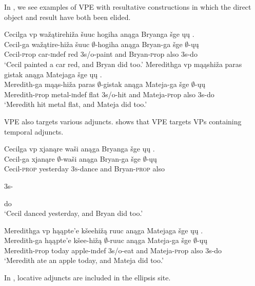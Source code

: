 \documentclass[output=paper]{LSP/langsci}
\begin{document}
In , we see examples of VPE with resultative constructions in which the direct object and result have both been elided. 

\ea\label{ex:johnson:6}
\ea\label{ex:johnson:6a}
\glll Cecilga  {\ob}{vp} wažątirehiža šuuc hogiha{\cb} anąga Bryanga šge {\ob}ųų{\cb} .\\
Cecil-ga {} wažątire-hiža šuuc $\emptyset$-hogiha anąga Bryan-ga šge $\emptyset$-ųų\\
Cecil-{\textsc prop} {} car-{\textsc indef} red {\textsc 3s/o}-paint and Bryan-{\textsc prop} also {\textsc 3s}-do\\
\trans `Cecil painted a car red, and Bryan did too.'
\ex\label{ex:johnson:6b}
\glll Meredithga  {\ob}{vp} mąąshiža paras gistak{\cb} anąga Matejaga šge {\ob}ųų{\cb} .\\
Meredith-ga {} mąąs-hiža paras $\emptyset$-gistak anąga Mateja-ga šge $\emptyset$-ųų\\
Meredith-{\textsc prop} {} metal-{\textsc indef} flat {\textsc 3s/o}-hit and Mateja-{\textsc prop} also {\textsc 3s}-do\\
\trans `Meredith hit metal flat, and Mateja did too.'
\z
\z

VPE also targets various adjuncts.  shows that VPE targets VPs containing temporal adjuncts. 

\ea\label{ex:johnson:7}
\ea
\glll Cecilga {\ob}{vp} xjanąre waši{\cb} anąga Bryanga šge {\ob}ųų{\cb} .\\
Cecil-ga {} xjanąre $\emptyset$-waši anąga Bryan-ga šge $\emptyset$-ųų\\
Cecil-\textsc{prop} {} yesterday \textsc{3s}-dance and Bryan-\textsc{prop} also \begin{sc}3s-\end{sc}do\\
\trans `Cecil danced yesterday, and Bryan did too.'

\ex
\glll Meredithga  {\ob}{vp} hąąpte'e kšeehižą ruuc{\cb} anąga Matejaga šge {\ob}ųų{\cb} .\\
Meredith-ga {} hąąpte'e kšee-hižą $\emptyset$-ruuc anąga Mateja-ga šge $\emptyset$-ųų\\
Meredith-{\textsc prop} {} today apple-{\textsc indef} {\textsc 3s/o}-eat and Mateja-{\textsc prop} also {\textsc 3s}-do\\
\trans `Meredith ate an apple today, and Mateja did too.'
\z
\z

In , locative adjuncts are included in the ellipsis site. 
\end{document}
